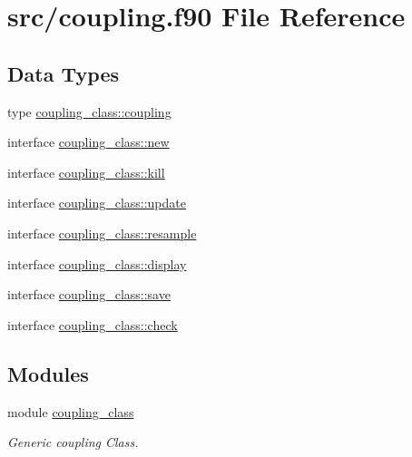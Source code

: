 \hypertarget{coupling_8f90}{}\section{src/coupling.f90 File Reference}
\label{coupling_8f90}
\subsection*{Data Types}
\begin{DoxyCompactItemize}
\item 
type \hyperlink{structcoupling__class_1_1coupling}{coupling\+\_\+class\+::coupling}
\item 
interface \hyperlink{interfacecoupling__class_1_1new}{coupling\+\_\+class\+::new}
\item 
interface \hyperlink{interfacecoupling__class_1_1kill}{coupling\+\_\+class\+::kill}
\item 
interface \hyperlink{interfacecoupling__class_1_1update}{coupling\+\_\+class\+::update}
\item 
interface \hyperlink{interfacecoupling__class_1_1resample}{coupling\+\_\+class\+::resample}
\item 
interface \hyperlink{interfacecoupling__class_1_1display}{coupling\+\_\+class\+::display}
\item 
interface \hyperlink{interfacecoupling__class_1_1save}{coupling\+\_\+class\+::save}
\item 
interface \hyperlink{interfacecoupling__class_1_1check}{coupling\+\_\+class\+::check}
\end{DoxyCompactItemize}
\subsection*{Modules}
\begin{DoxyCompactItemize}
\item 
module \hyperlink{namespacecoupling__class}{coupling\+\_\+class}
\begin{DoxyCompactList}\small\item\em Generic coupling Class. \end{DoxyCompactList}\end{DoxyCompactItemize}
